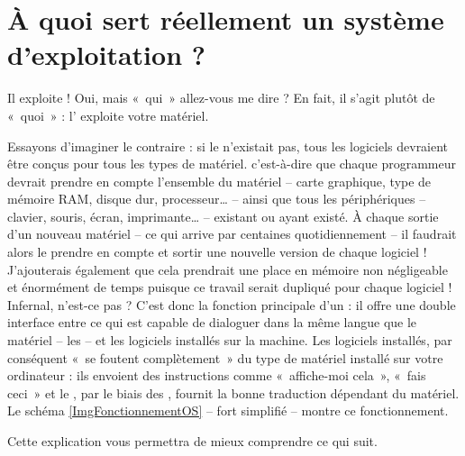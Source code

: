 \section{À quoi sert réellement un système d'exploitation ?}
Il exploite ! Oui, mais «~qui~» allez-vous me dire ? En fait, il s'agit plutôt de «~quoi~» : l' exploite votre matériel.\par
Essayons d'imaginer le contraire : si le  n'existait pas, tous les logiciels devraient être conçus pour tous les types de matériel. c'est-à-dire que chaque programmeur devrait prendre en compte l'ensemble du matériel -- carte graphique, type de mémoire RAM, disque dur, processeur\ldots{} -- ainsi que tous les périphériques -- clavier, souris, écran, imprimante\ldots{} -- existant ou ayant existé. À chaque sortie d'un nouveau matériel -- ce qui arrive par centaines quotidiennement -- il faudrait alors le prendre en compte et sortir une nouvelle version de chaque logiciel !\\
J'ajouterais également que cela prendrait une place en mémoire non négligeable et énormément de temps puisque ce travail serait dupliqué pour chaque logiciel ! Infernal, n'est-ce pas ? C'est donc la fonction principale d'un  : il offre une double interface entre ce qui est capable de dialoguer dans la même langue que le matériel -- les  -- et les logiciels installés sur la machine. Les logiciels installés, par conséquent «~se foutent complètement~» du type de matériel installé sur votre ordinateur : ils envoient des instructions comme «~affiche-moi cela~», «~fais ceci~» et le , par le biais des , fournit la bonne traduction dépendant du matériel. Le schéma \ref{ImgFonctionnementOS} -- fort simplifié -- montre ce fonctionnement.\par
{}
Cette explication vous permettra de mieux comprendre ce qui suit.
